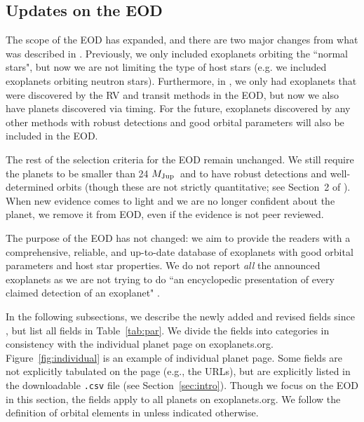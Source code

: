 \documentclass[11pt,preprint]{aastex}
\def\mjup{$M_{\rm Jup}$}
\begin{document}
\begin{CJK*}{UTF8}{gbsn}
\section{Updates on the EOD}\label{sec:update}

The scope of the EOD has expanded, and there are two major changes
from what was described in \cite{Wright2011}. Previously, we only
included exoplanets orbiting the ``normal stars", but now we are not
limiting the type of host stars (e.g. we included exoplanets orbiting
neutron stars). Furthermore, in \cite{Wright2011}, we only had
exoplanets that were discovered by the RV and transit methods in the
EOD, but now we also have planets discovered via timing. For the
future, exoplanets discovered by any other methods with robust
detections and good orbital parameters will also be included in the
EOD.

The rest of the selection criteria for the EOD remain unchanged. We
still require the planets to be smaller than 24 \mjup\ and to have
robust detections and well-determined orbits (though these are not
strictly quantitative; see Section~2 of \citealt{Wright2011}). When
new evidence comes to light and we are no longer confident about the
planet, we remove it from EOD, even if the evidence is not peer
reviewed. 

The purpose of the EOD has not changed: we aim to provide the readers
with a comprehensive, reliable, and up-to-date database of exoplanets
with good orbital parameters and host star properties. We do not
report \textit{all} the announced exoplanets as we are not trying to
do ``an encyclopedic presentation of every claimed detection of an
exoplanet" \citep{Wright2011}.

In the following subsections, we describe the newly added and revised
fields since \cite{Wright2011}, but list all fields in
Table~\ref{tab:par}. We divide the fields into categories in
consistency with the individual planet page on
exoplanets.org. Figure~\ref{fig:individual} is an example of
individual planet page. Some fields are not explicitly tabulated on
the page (e.g., the URLs), but are explicitly listed in the
downloadable {\tt .csv} file (see Section~\ref{sec:intro}). Though we
focus on the EOD in this section, the fields apply to all planets on
exoplanets.org. We follow the definition of orbital elements in
\cite{Wright2013} unless indicated otherwise.



\end{CJK*}
\end{document}
